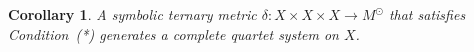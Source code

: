 \documentclass{article}
\newtheorem{lemma}{Lemma}
\newtheorem{corollary}{Corollary}
\begin{document}
%
%
%
%
%
%
%
% 
%
%
%
%
%

\begin{corollary}\label{cor:complete}
 A symbolic ternary metric $\delta:X\times X \times X\to M^{\odot}$ 
that satisfies Condition~(*) generates a complete quartet system on $X$.
\end{corollary}
\end{document}

